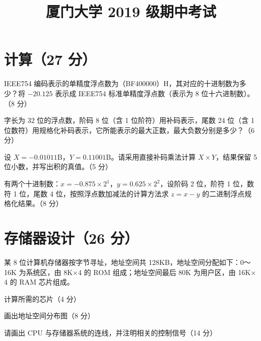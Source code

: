 \documentclass[fontset=exam]{exam-zh}
\title{厦门大学 2019 级期中考试}
\begin{document}
\maketitle
\noindent{}\par
{}
\section{计算（27 分）}
\begin{question}[index=1]
IEEE754 编码表示的单精度浮点数为（BF400000）H，其对应的十进制数为多少？将 \(-20.125\) 表示成 IEEE754 标准单精度浮点数（表示为 8 位十六进制数）。（8 分）
\end{question}
\begin{question}[index=2]
字长为 32 位的浮点数，阶码 8 位（含 1 位阶符）用补码表示，尾数 24 位（含 1 位数符）用规格化补码表示，它所能表示的最大正数，最大负数分别是多少？（6 分）
\end{question}
\begin{question}[index=3]
设 \(X=-0.01011\mathrm{B}\)，\(Y=0.11001\mathrm{B}\)。请采用直接补码乘法计算 \(X\times Y\)，结果保留 5 位小数，并写出积的真值。（5 分）
\end{question}
\begin{question}[index=4]
有两个十进制数：\(x=-0.875\times2^1\)，\(y=0.625\times2^2\)，设阶码 2 位，阶符 1 位，数符 1 位，尾数 4 位，按照浮点数加减法的计算方法求 \(z=x-y\) 的二进制浮点规格化结果。（8 分）
\end{question}
\section{存储器设计（26 分）}
某 8 位计算机存储器按字节寻址，地址空间共 128KB，地址空间分配如下：0～16K 为系统区，由 8K\(\times\)4 的 ROM 组成；地址空间最后 80K 为用户区，由 16K\(\times\)4 的 RAM 芯片组成。\par
\begin{question}[index=1]
计算所需的芯片（4 分）
\end{question}
\begin{question}[index=2]
画出地址空间分布图（8 分）
\end{question}
\begin{question}[index=3]
请画出 CPU 与存储器系统的连线，并注明相关的控制信号（14 分）
\end{question}
\newpage
{}
\end{document}

